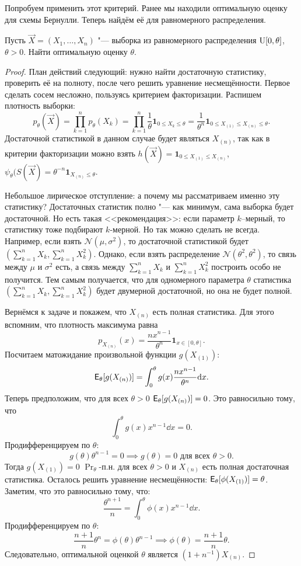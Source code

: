 Попробуем применить этот критерий. Ранее мы находили оптимальную оценку для схемы Бернулли. Теперь найдём её для равномерного распределения.
\begin{problem}
	Пусть $\vec{X} = (X_{1}, \ldots, X_{n})$ "--- выборка из равномерного распределения $\mathrm{U}[0, \theta]$, $\theta > 0$. Найти оптимальную оценку $\theta$.
\end{problem}
\begin{proof}
	План действий следующий: нужно найти достаточную статистику, проверить её на полноту, после чего решить уравнение несмещённости. Первое сделать сосем несложно, пользуясь критерием факторизации. Распишем плотность выборки:
	\[
		p_{\theta}(\vec{X})
		= \prod_{k = 1}^{n} p_{\theta}(X_{k})
		= \prod_{k = 1}^{n} \frac{1}{\theta}\mathbf{1}_{0 \leq X_{k} \leq \theta}
		= \frac{1}{\theta^{n}}\mathbf{1}_{0 \leq X_{(1)} \leq X_{(n)} \leq \theta}.
	\]
	Достаточной статистикой в данном случае будет являться $X_{(n)}$, так как в критерии факторизации можно взять $h(\vec{X}) = \mathbf{1}_{0 \leq X_{(1)} \leq X_{(n)}}$, $\psi_{\theta}(S(\vec{X}) = \theta^{-n}\mathbf{1}_{X_{(n)} \leq \theta}$. 

	Небольшое лирическое отступление: а почему мы рассматриваем именно эту статистику? Достаточных статистик полно "--- как минимум, сама выборка будет достаточной. Но есть такая <<рекомендация>>: если параметр $k$–мерный, то статистику тоже подбирают $k$-мерной. Но так можно сделать не всегда. Например, если взять $\mathcal{N}(\mu, \sigma^{2})$, то достаточной статистикой будет $(\sum_{k = 1}^{n} X_{k}, \sum_{k = 1}^{n} X_{k}^{2})$. Однако, если взять распределение $\mathcal{N}(\theta^{2}, \theta^{2})$, то связь между $\mu$ и $\sigma^{2}$ есть, а связь между $\sum_{k = 1}^{n} X_{k}$ и $\sum_{k = 1}^{n} X_{k}^{2}$ построить особо не получится. Тем самым получается, что для одномерного параметра $\theta$ статистика $(\sum_{k = 1}^{n} X_{k}, \sum_{k = 1}^{n} X_{k}^{2})$ будет двумерной достаточной, но она не будет полной.

	Вернёмся к задаче и покажем, что $X_{(n)}$ есть полная статистика. Для этого вспомним, что плотность максимума равна
	\[
		p_{X_{(n)}}(x) 
		= \frac{nx^{n - 1}}{\theta^{n}}\mathbf{1}_{x \in [0, \theta]}.
	\]
	Посчитаем матожидание произвольной функции $g(X_{(1)})$:
	\[
		\operatorname{\mathsf{E}}_{\theta}[g(X_{(n)})]
		= \int_{0}^{\theta} g(x)\frac{nx^{n - 1}}{\theta^{n}}\dd x.
	\]
	Теперь предположим, что для всех $\theta > 0$ $\operatorname{\mathsf{E}}_{\theta}[g(X_{(n)})] = 0$. Это равносильно тому, что
	\[
		\int_{0}^{\theta} g(x)x^{n - 1}\dd x = 0.
	\]
	Продифференцируем по $\theta$:
	\[
		g(\theta)\theta^{n - 1} 
		= 0
		\implies
		g(\theta) 
		= 0 \text{ для всех } \theta > 0.
	\]
	Тогда $g(X_{(1)}) = 0$ $\Pr_{\theta}$-п.н. для всех $\theta > 0$ и $X_{(n)}$ есть полная достаточная статистика. Осталось решить уравнение несмещённости: $\operatorname{\mathsf{E}}_{\theta}[\phi(X_{(1)})] = \theta$. Заметим, что это равносильно тому, что:
	\[
		\frac{\theta^{n + 1}}{n}
		= \int_{0}^{\theta} \phi(x)x^{n - 1}\dd x.
	\]
	Продифференцируем по $\theta$:
	\[
		\frac{n + 1}{n}\theta^{n} 
		= \phi(\theta)\theta^{n - 1}
		\implies
		\phi(\theta) = \frac{n + 1}{n}\theta.
	\]
	Следовательно, оптимальной оценкой $\theta$ является $(1 + n^{-1})X_{(n)}$.
\end{proof}

